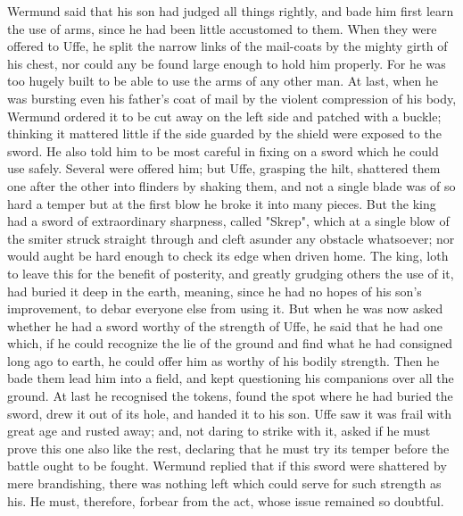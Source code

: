 \documentclass[10pt,a4paper]{report}
\begin{document}
Wermund said that his son had judged all things rightly, and bade him first learn the use of arms, since he had been little accustomed to them. When they were offered to Uffe, he split the narrow links of the mail-coats by the mighty girth of his chest, nor could any be found large enough to hold him properly. For he was too hugely built to be able to use the arms of any other man. At last, when he was bursting even his father's coat of mail by the violent compression of his body, Wermund ordered it to be cut away on the left side and patched with a buckle; thinking it mattered little if the side guarded by the shield were exposed to the sword. He also told him to be most careful in fixing on a sword which he could use safely. Several were offered him; but Uffe, grasping the hilt, shattered them one after the other into flinders by shaking them, and not a single blade was of so hard a temper but at the first blow he broke it into many pieces. But the king had a sword of extraordinary sharpness, called "Skrep", which at a single blow of the smiter struck straight through and cleft asunder any obstacle whatsoever; nor would aught be hard enough to check its edge when driven home. The king, loth to leave this for the benefit of posterity, and greatly grudging others the use of it, had buried it deep in the earth, meaning, since he had no hopes of his son's improvement, to debar everyone else from using it. But when he was now asked whether he had a sword worthy of the strength of Uffe, he said that he had one which, if he could recognize the lie of the ground and find what he had consigned long ago to earth, he could offer him as worthy of his bodily strength. Then he bade them lead him into a field, and kept questioning his companions over all the ground. At last he recognised the tokens, found the spot where he had buried the sword, drew it out of its hole, and handed it to his son. Uffe saw it was frail with great age and rusted away; and, not daring to strike with it, asked if he must prove this one also like the rest, declaring that he must try its temper before the battle ought to be fought. Wermund replied that if this sword were shattered by mere brandishing, there was nothing left which could serve for such strength as his. He must, therefore, forbear from the act, whose issue remained so doubtful.\\
\end{document}
